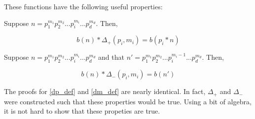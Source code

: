\documentclass[../paper.tex]{article}
\begin{document}
These functions have the following useful properties:

\begin{theorem}[Property]\label{dp_def}
Suppose $n = p_1^{m_1} p_2^{m_2} ... p_i^{m_i} ... p_d^{m_d}$.
Then,

$$ b(n) * \Delta_+(p_i, m_i) = b(p_i * n)$$

\end{theorem}

\begin{theorem}[Property]\label{dm_def}
Suppose $n = p_1^{m_1} p_2^{m_2} ... p_i^{m_i} ... p_d^{m_d}$ and
that $n' = p_1^{m_1} p_2^{m_2} ... p_i^{m_i - 1} ... p_d^{m_d}$. Then,

$$ b(n) * \Delta_-(p_i, m_i) = b(n')$$

\end{theorem}

The proofs for {\ref{dp_def}} and {\ref{dm_def}} are nearly identical.
In fact, $\Delta_+$ and $\Delta_-$ were constructed such that
these properties would be true. Using a bit of algebra, it is not
hard to show that these propeties are true.
\end{document}
